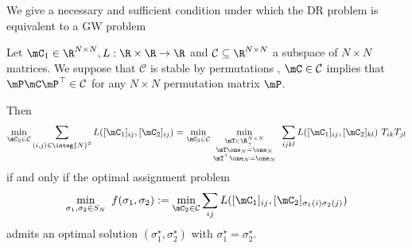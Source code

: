 We give a necessary and sufficient condition under which the DR problem is equivalent to a GW problem
\begin{proposition}
	\label{prop:bilinear_problem}
	Let $\mC_1 \in \R^{N \times N}, L: \R \times \R \to \R$ and $\mathcal{C} \subseteq \R^{N \times N}$ a subspace of $N \times N$ matrices. We suppose that $\mathcal{C}$ is stable by permutations \ie, $\mC \in \mathcal{C}$ implies that $\mP \mC \mP^\top \in \mathcal{C}$ for any $N \times N$ permutation matrix $\mP$.
	
	Then
	\begin{equation}
		\label{eq:equality_between_both}
		\min_{\mC_2 \in \mathcal{C}} \sum_{(i,j) \in \integ{N}^2} L([\mC_1]_{ij}, [ \mC_2]_{ij}) = \min_{\mC_2 \in \mathcal{C}} \min_{\begin{smallmatrix} \mT \in \R_{+}^{N \times N} \\ \mT \one_N = \one_N \\ \mT^\top \one_N = \one_N \end{smallmatrix}} \ \sum_{ijkl} L([\mC_1]_{ij}, [\mC_2]_{kl}) \ T_{ik} T_{jl}
	\end{equation}
	if and only if the optimal assignment problem
	\begin{equation}
		\min_{\sigma_1, \sigma_2 \in S_N} \ f(\sigma_1, \sigma_2) := \min_{\mC_2 \in \mathcal{C}} \sum_{ij} L([\mC_1]_{ij}, [\mC_2]_{\sigma_1(i)\sigma_2(j)})
	\end{equation}
	admits an optimal solution $(\sigma_1^\star, \sigma_2^\star)$ with $\sigma_1^\star=\sigma_2^\star$.
\end{proposition}
